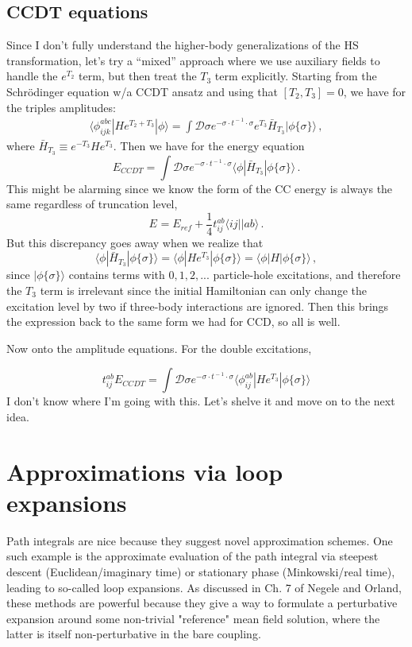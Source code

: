 \documentclass[12pt]{article}
\begin{document}
\subsection{CCDT equations}
Since I don't fully understand the higher-body generalizations of the HS transformation, let's try a ``mixed'' approach where we use auxiliary fields to handle the $e^{T_2}$ term, but then treat the $T_3$ term explicitly.  Starting from the Schr\"odinger equation w/a CCDT ansatz and using that $[T_2,T_3]=0$, we have for the triples amplitudes:
\begin{eqnarray}
\langle\phi^{abc}_{ijk}|He^{T_2+T_3}|\phi\rangle = \int \mathcal{D}\sigma e^{-\sigma\cdot t^{\!-1}\!\cdot\sigma} e^{T_3}\bar{H}_{T_3}|\phi\{\sigma\}\rangle \,,
\end{eqnarray}
where $\bar{H}_{T_3}\equiv e^{-T_3}He^{T_3}$. Then we have for the energy equation
\begin{equation}
E_{CCDT} = \int \mathcal{D}\sigma e^{-\sigma\cdot t^{\!-1}\!\cdot\sigma} \langle\phi|\bar{H}_{T_3}|\phi\{\sigma\}\rangle\,.
\end{equation}
This might be alarming since we know the form of the CC energy is always the same regardless of truncation level,
\begin{equation}
E_{} = E_{ref} + \frac{1}{4}t^{ab}_{ij}\langle ij||ab\rangle\,.
\end{equation}
But this discrepancy goes away when we realize that 
\begin{equation}
\langle \phi|\bar{H}_{T_3}|\phi\{\sigma\}\rangle= \langle \phi|He^{T_3}|\phi\{\sigma\}\rangle = \langle \phi|H|\phi\{\sigma\}\rangle\,,
\end{equation}
since $|\phi\{\sigma\}\rangle$ contains terms with $0,1,2,...$ particle-hole excitations, and therefore the $T_3$ term is irrelevant since the initial Hamiltonian can only change the excitation level by two if three-body interactions are ignored. Then this brings the expression back to the same form we had for CCD, so all is well.

Now onto the amplitude equations. For the double excitations,

\begin{equation}
t^{ab}_{ij} E_{CCDT} = \int \mathcal{D}\sigma e^{-\sigma\cdot t^{\!-1}\!\cdot\sigma} \langle\phi^{ab}_{ij}|He^{T_3}|\phi\{\sigma\}\rangle
\end{equation}
I don't know where I'm going with this. Let's shelve it and move on to the next idea.

\section{Approximations via loop expansions}
Path integrals are nice because they suggest novel approximation schemes. One such example is the approximate evaluation of the path integral via steepest descent (Euclidean/imaginary time) or stationary phase (Minkowski/real time), leading to so-called loop expansions. As discussed in Ch. 7 of Negele and Orland, these methods are powerful because they give a way to formulate a perturbative expansion around some non-trivial "reference" mean field solution, where the latter is itself non-perturbative in the bare coupling.  



 
\end{document}
